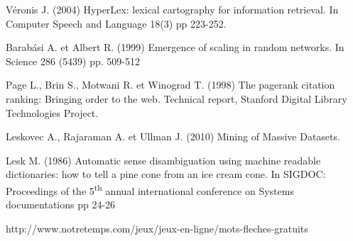 \begin{thebibliography}{10}
Véronis J. (2004)
HyperLex: lexical cartography for information retrieval.
In Computer Speech and Language 18(3) pp 223-252. \label{bib:veronis} 

Barabási A. et Albert R. (1999)
Emergence of scaling in random networks.
In Science 286 (5439) pp. 509-512 \label{bib:barabasi}

Page L., Brin S., Motwani R. et Winograd T. (1998)
The pagerank citation ranking: Bringing order to the web.
Technical report, Stanford Digital Library Technologies Project.
\label{bib:pagerank}

Leskovec A., Rajaraman A. et Ullman J. (2010)
Mining of Massive Datasets.
\label{bib:linkanalysis}

Lesk M. (1986)
Automatic sense disambiguation using machine readable dictionaries:
how to tell a pine cone from an ice cream cone.
In SIGDOC: Proceedings of the 5\textsuperscript{th} annual international
conference on Systems documentations pp 24-26 
\label{bib:lesk}

 http://www.notretemps.com/jeux/jeux-en-ligne/mots-fleches-gratuits
\label{bib:mfg}

\end{thebibliography}

